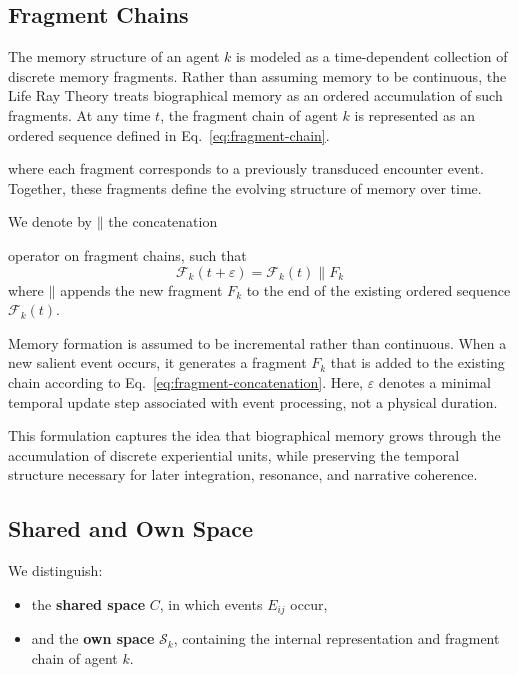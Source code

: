 \documentclass[12pt,a4paper]{article}
\begin{document}
\subsection{Fragment Chains}

The memory structure of an agent $k$ is modeled as a time-dependent
collection of discrete memory fragments.
Rather than assuming memory to be continuous, the Life Ray Theory
treats biographical memory as an ordered accumulation of such fragments.
At any time $t$, the fragment chain of agent $k$ is represented as an ordered sequence
defined in Eq.~\eqref{eq:fragment-chain}.

where each fragment corresponds to a previously transduced encounter event.
Together, these fragments define the evolving structure of memory over time.

We denote by $\mathbin{\|}$ the concatenation~

 operator on fragment chains, such that
\begin{equation}
\mathcal{F}_k(t+\varepsilon) = \mathcal{F}_k(t) \mathbin{\|} F_k
\label{eq:fragment-concatenation}
\end{equation}
where $\mathbin{\|}$ appends the new fragment $F_k$ to the end of the existing ordered
sequence $\mathcal{F}_k(t)$.

Memory formation is assumed to be incremental rather than continuous.
When a new salient event occurs, it generates a fragment $F_k$ that is
added to the existing chain according to Eq.~\eqref{eq:fragment-concatenation}.
Here, $\varepsilon$ denotes a minimal temporal update step associated
with event processing, not a physical duration.

This formulation captures the idea that biographical memory grows
through the accumulation of discrete experiential units, while
preserving the temporal structure necessary for later integration,
resonance, and narrative coherence.

\subsection{Shared and Own Space}

We distinguish:
\begin{itemize}
    \item the \textbf{shared space} $C$, in which events $E_{ij}$ occur,
    \item and the \textbf{own space} $\mathcal{S}_k$, containing the
          internal representation and fragment chain of agent $k$.
\end{itemize}
\end{document}
